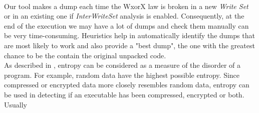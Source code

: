 \paragraph{}
Our tool makes a dump each time the WxorX law is broken in a new \textit{Write Set} or in an existing one if \textit{InterWriteSet} analysis is enabled. Consequently, at the end of the execution we may have a lot of dumps and check them manually can be very time-consuming. Heuristics help in automatically identify the dumps that are most likely to work and also provide a "best dump", the one with the greatest chance to be the contain the original unpacked code.\\ 
As described in \cite{Practical_Malware_Analysis}, entropy can be considered as a measure of the disorder of a program. For example, random data have the highest possible entropy. Since compressed or encrypted data more closely resembles random data, entropy can be used in detecting if an executable has been compressed, encrypted or both. Usually
